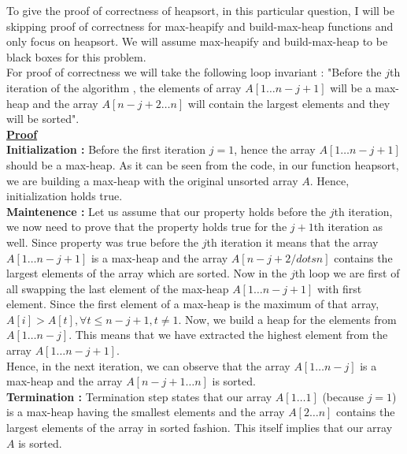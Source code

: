 \documentclass[14pt]{article}
\begin{document}
		To give the proof of correctness of heapsort, in this particular question, I will be skipping proof of correctness for max-heapify and build-max-heap functions and only focus on heapsort. We will assume max-heapify and build-max-heap to be black boxes for this problem.\\
		For proof of correctness we will take the following loop invariant : "Before the $j$th iteration of the algorithm , the elements of array $A[1 \dots n-j+1]$ will be a max-heap and the array $A[n-j+2\dots n]$ will contain the largest elements and they will be sorted".\\
		\linebreak
		\textbf{\underline{Proof}}\\
		\linebreak
		\textbf{Initialization : }Before the first iteration $j = 1$, hence the array $A[1\dots n-j+1]$ should be a max-heap. As it can be seen from the code, in our function heapsort, we are building a max-heap with the original unsorted array $A$. Hence, initialization holds true.\\
		\textbf{Maintenence : }Let us assume that our property holds before the $j$th iteration, we now need to prove that the property holds true for the $j+1$th iteration as well. Since property was true before the $j$th iteration it means that the array $A[1\dots n-j+1]$ is a max-heap and the array $A[n-j+2/dots n]$ contains the largest elements of the array which are sorted. Now in the $j$th loop we are first of all swapping the last element of the max-heap $A[1\dots n-j+1]$ with first element. Since the first element of a max-heap is the maximum of that array, $A[i] > A[t], \forall t \leq n-j+1, t \neq 1$. Now, we build a heap for the elements from $A[1\dots n-j]$. This means that we have extracted the highest element from the array $A[1\dots n-j+1]$. \\
		Hence, in the next iteration, we can observe that the array $A[1\dots n-j]$ is a max-heap and the array $A[n-j+1\dots n]$ is sorted.\\
		\linebreak
		\textbf{Termination : }Termination step states that our array $A[1\dots 1]$ (because $j=1$) is a max-heap having the smallest elements and the array $A[2\dots n]$ contains the largest elements of the array in sorted fashion. This itself implies that our array $A$ is sorted.  
		
\end{document}
